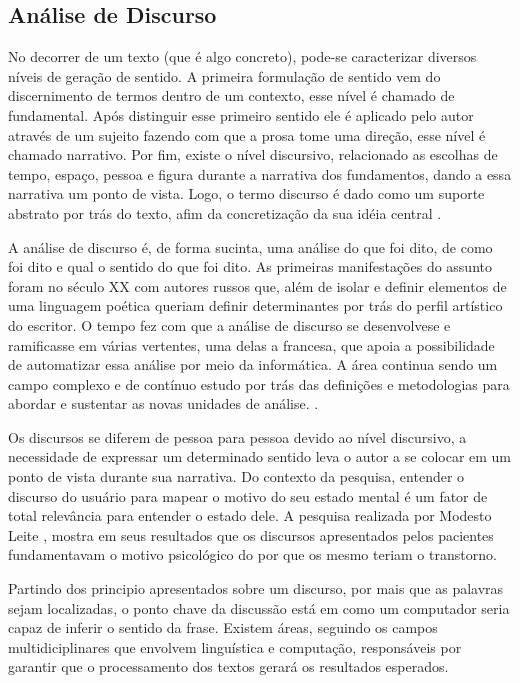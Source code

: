 \subsection{Análise de Discurso}
No decorrer de um texto (que é algo concreto), pode-se caracterizar diversos níveis de geração de sentido.
A primeira formulação de sentido vem do discernimento de termos dentro de um contexto, esse nível é chamado de fundamental. Após distinguir esse primeiro sentido ele é aplicado pelo autor através de um sujeito fazendo com que a prosa tome uma direção, esse nível é chamado narrativo. Por fim, existe o nível discursivo, relacionado as escolhas de tempo, espaço, pessoa e figura durante a narrativa dos fundamentos, dando a essa narrativa um ponto de vista. Logo, o termo discurso é dado como um suporte abstrato por trás do texto, afim da concretização da sua idéia central \cite[13-17]{gregolin1995ad}.

A análise de discurso é, de forma sucinta, uma análise do que foi dito, de como foi dito e qual o sentido do que foi dito. As primeiras manifestações do assunto foram no século XX com autores russos que, além de isolar e definir elementos de uma linguagem poética queriam definir determinantes por trás do perfil artístico do escritor. O tempo fez com que a análise de discurso se desenvolvese e ramificasse em várias vertentes, uma delas a francesa, que apoia a possibilidade de automatizar essa análise por meio da informática. A área continua sendo um campo complexo e de contínuo estudo por trás das definições e metodologias para abordar e sustentar as novas unidades de análise. \cite[22]{souza2006ad}.

Os discursos se diferem de pessoa para pessoa devido ao nível discursivo, a necessidade de expressar um determinado sentido leva o autor a se colocar em um ponto de vista durante sua narrativa. Do contexto da pesquisa, entender o discurso do usuário para mapear o motivo do seu estado mental é um fator de total relevância para entender o estado dele. A pesquisa realizada por Modesto Leite \cite[134]{modesto2005adepre}, mostra em seus resultados que os discursos apresentados pelos pacientes fundamentavam o motivo psicológico do por que os mesmo teriam o transtorno. 

Partindo dos principio apresentados sobre um discurso, por mais que as palavras sejam localizadas, o ponto chave da discussão está em como um computador seria capaz de inferir o sentido da frase. Existem áreas, seguindo os campos multidiciplinares que envolvem linguística e computação, responsáveis por garantir que o processamento dos textos gerará os resultados esperados.
